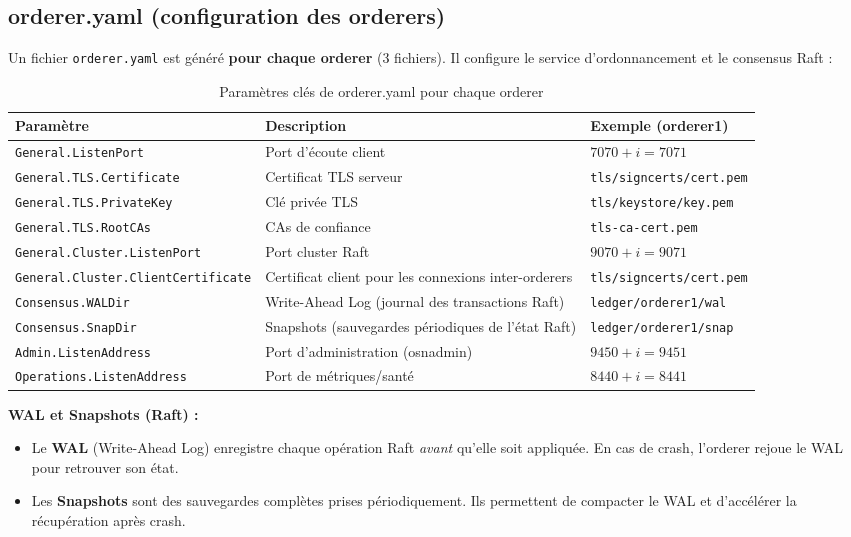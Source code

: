 \documentclass[12pt,a4paper,twoside]{report}
\begin{document}
\subsection{orderer.yaml (configuration des orderers)}

Un fichier \texttt{orderer.yaml} est généré \textbf{pour chaque orderer} (3 fichiers). Il configure le service d'ordonnancement et le consensus Raft :

\begin{table}[H]
\centering
\begin{tabularx}{\textwidth}{lXp{4cm}}
\toprule
\textbf{Paramètre} & \textbf{Description} & \textbf{Exemple (orderer1)} \\
\midrule
\texttt{General.ListenPort} & Port d'écoute client & $7070 + i = 7071$ \\
\texttt{General.TLS.Certificate} & Certificat TLS serveur & \texttt{tls/signcerts/cert.pem} \\
\texttt{General.TLS.PrivateKey} & Clé privée TLS & \texttt{tls/keystore/key.pem} \\
\texttt{General.TLS.RootCAs} & CAs de confiance & \texttt{tls-ca-cert.pem} \\
\texttt{General.Cluster.ListenPort} & Port cluster Raft & $9070 + i = 9071$ \\
\texttt{General.Cluster.ClientCertificate} & Certificat client pour les connexions inter-orderers & \texttt{tls/signcerts/cert.pem} \\
\texttt{Consensus.WALDir} & Write-Ahead Log (journal des transactions Raft) & \texttt{ledger/orderer1/wal} \\
\texttt{Consensus.SnapDir} & Snapshots (sauvegardes périodiques de l'état Raft) & \texttt{ledger/orderer1/snap} \\
\texttt{Admin.ListenAddress} & Port d'administration (osnadmin) & $9450 + i = 9451$ \\
\texttt{Operations.ListenAddress} & Port de métriques/santé & $8440 + i = 8441$ \\
\bottomrule
\end{tabularx}
\caption{Paramètres clés de orderer.yaml pour chaque orderer}
\end{table}

\begin{infobox}
\textbf{WAL et Snapshots (Raft) :}
\begin{itemize}
    \item Le \textbf{WAL} (Write-Ahead Log) enregistre chaque opération Raft \textit{avant} qu'elle soit appliquée. En cas de crash, l'orderer rejoue le WAL pour retrouver son état.
    \item Les \textbf{Snapshots} sont des sauvegardes complètes prises périodiquement. Ils permettent de compacter le WAL et d'accélérer la récupération après crash.
\end{itemize}
\end{infobox}
\end{document}
